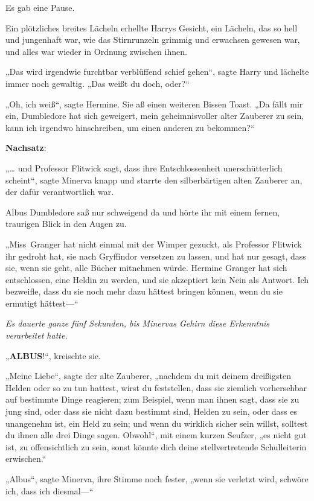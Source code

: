 {Es gab eine Pause.

Ein plötzliches breites Lächeln erhellte Harrys Gesicht, ein Lächeln, das so hell und jungenhaft war, wie das Stirnrunzeln grimmig und erwachsen gewesen war, und alles war wieder in Ordnung zwischen ihnen.

„Das wird irgendwie furchtbar verblüffend schief gehen“, sagte Harry und lächelte immer noch gewaltig. „Das weißt du doch, oder?“

„Oh, ich weiß“, sagte Hermine. Sie aß einen weiteren Bissen Toast. „Da fällt mir ein, Dumbledore hat sich geweigert, mein geheimnisvoller alter Zauberer zu sein, kann ich irgendwo hinschreiben, um einen anderen zu bekommen?“

\textbf{Nachsatz}:

„… und Professor Flitwick sagt, dass ihre Entschlossenheit unerschütterlich scheint“, sagte Minerva knapp und starrte den silberbärtigen alten Zauberer an, der dafür verantwortlich war.

Albus Dumbledore saß nur schweigend da und hörte ihr mit einem fernen, traurigen Blick in den Augen zu.

„Miss~Granger hat nicht einmal mit der Wimper gezuckt, als Professor Flitwick ihr gedroht hat, sie nach Gryffindor versetzen zu lassen, und hat nur gesagt, dass sie, wenn sie geht, alle Bücher mitnehmen würde. Hermine Granger hat sich entschlossen, eine Heldin zu werden, und sie akzeptiert kein Nein als Antwort. Ich bezweifle, dass du sie noch mehr dazu hättest bringen können, wenn du sie ermutigt hättest—“

\emph{Es dauerte ganze fünf Sekunden, bis Minervas Gehirn diese Erkenntnis verarbeitet hatte.}

„\textbf{ALBUS}!“, kreischte sie.

„Meine Liebe“, sagte der alte Zauberer, „nachdem du mit deinem dreißigsten Helden oder so zu tun hattest, wirst du feststellen, dass sie ziemlich vorhersehbar auf bestimmte Dinge reagieren; zum Beispiel, wenn man ihnen sagt, dass sie zu jung sind, oder dass sie nicht dazu bestimmt sind, Helden zu sein, oder dass es unangenehm ist, ein Held zu sein; und wenn du wirklich sicher sein willst, solltest du ihnen alle drei Dinge sagen. Obwohl“, mit einem kurzen Seufzer, „es nicht gut ist, zu offensichtlich zu sein, sonst könnte dich deine stellvertretende Schulleiterin erwischen.“

„Albus“, sagte Minerva, ihre Stimme noch fester, „wenn sie verletzt wird, schwöre ich, dass ich diesmal—“

}
